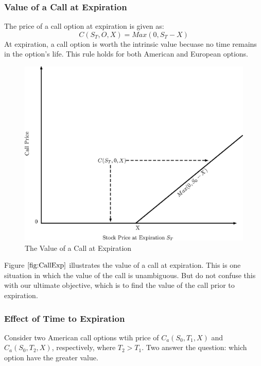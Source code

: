 \documentclass{book}
\theoremstyle{definition}
\theoremstyle{remark}
\begin{document}
        \subsubsection{Value of a Call at Expiration}
            The price of a call option at expiration is given as:
                \begin{equation}
                    C(S_T, O, X) = Max(0, S_T - X)
                \end{equation}
            At expiration, a call option is worth the intrinsic value becuase no time remains in the option's life. This rule holds for both American and European options.
            
                \begin{figure}[h]
                    \centering
                        \includegraphics[scale=0.65]{images/fig:CallExp.eps}
                    \caption{The Value of a Call at Expiration}
                    \label{fig:CallExp}                
                \end{figure}            
            Figure $\ref{fig:CallExp}$ illustrates the value of a call at expiration. This is one situation in which the value of the call is unambiguous. But do not confuse this with our ultimate objective, which is to find the value of the call prior to expiration.
   
        \subsubsection{Effect of Time to Expiration}
            Consider two American call options wtih price of $C_a(S_0,T_1,X)$ and $C_a(S_0,T_2,X)$, respectively, where $T_2 > T_1$. Two answer the question: which option have the greater value. 
            
\end{document}
